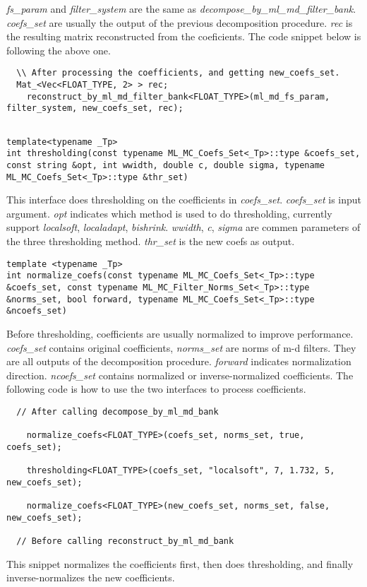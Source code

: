 \documentclass[a4paper,5pt]{article}
\begin{document}
\textit{fs\_param} and \textit{filter\_system} are the same as \textit{decompose\_by\_ml\_md\_filter\_bank}. \textit{coefs\_set} are usually the output of the previous decomposition procedure. \textit{rec} is the resulting matrix reconstructed from the coeficients. The code snippet below is following the above one.

\begin{lstlisting}
  \\ After processing the coefficients, and getting new_coefs_set.
  Mat_<Vec<FLOAT_TYPE, 2> > rec;
	reconstruct_by_ml_md_filter_bank<FLOAT_TYPE>(ml_md_fs_param, filter_system, new_coefs_set, rec);
	
\end{lstlisting}

\begin{lstlisting}
template<typename _Tp>
int thresholding(const typename ML_MC_Coefs_Set<_Tp>::type &coefs_set, const string &opt, int wwidth, double c, double sigma, typename ML_MC_Coefs_Set<_Tp>::type &thr_set)
\end{lstlisting}

This interface does thresholding on the coefficients in \textit{coefs\_set}.
\textit{coefs\_set} is input argument. \textit{opt} indicates which method is used to do thresholding, currently support \textit{localsoft}, \textit{localadapt}, \textit{bishrink}. \textit{wwidth}, \textit{c}, \textit{sigma} are commen parameters of the three thresholding method. \textit{thr\_set} is the new coefs as output.

\begin{lstlisting}
template <typename _Tp>
int normalize_coefs(const typename ML_MC_Coefs_Set<_Tp>::type &coefs_set, const typename ML_MC_Filter_Norms_Set<_Tp>::type &norms_set, bool forward, typename ML_MC_Coefs_Set<_Tp>::type &ncoefs_set)
\end{lstlisting}

Before thresholding, coefficients are usually normalized to improve performance. \textit{coefs\_set} contains original coefficients, \textit{norms\_set} are norms of m-d filters. They are all outputs of the decomposition procedure. \textit{forward} indicates normalization direction. \textit{ncoefs\_set} contains normalized or inverse-normalized coefficients. The following code is how to use the two interfaces to process coefficients.

\begin{lstlisting}
  // After calling decompose_by_ml_md_bank

	normalize_coefs<FLOAT_TYPE>(coefs_set, norms_set, true, coefs_set);
	
	thresholding<FLOAT_TYPE>(coefs_set, "localsoft", 7, 1.732, 5, new_coefs_set);

	normalize_coefs<FLOAT_TYPE>(new_coefs_set, norms_set, false, new_coefs_set);
	
  // Before calling reconstruct_by_ml_md_bank
\end{lstlisting} 

  This snippet normalizes the coefficients first, then does thresholding, and finally inverse-normalizes the new coefficients.
\end{document}
